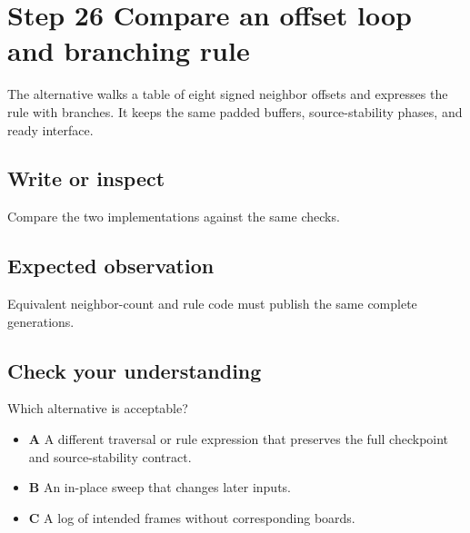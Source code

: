 \section{Step 26 Compare an offset loop and branching
  rule}\label{008-life-generations-s26-step-26-compare-an-offset-loop-and-branching-rule}

The alternative walks a table of eight signed neighbor offsets and
expresses the rule with branches. It keeps the same padded buffers,
source-stability phases, and ready interface.

\subsection{Write or
  inspect}\label{008-life-generations-s26-write-or-inspect}

Compare the two implementations against the same checks.

\subsection{Expected
  observation}\label{008-life-generations-s26-expected-observation}

Equivalent neighbor-count and rule code must publish the same complete
generations.

\subsection{Check your
  understanding}\label{008-life-generations-s26-check-your-understanding}

Which alternative is acceptable?

\begin{itemize}
  \tightlist
  \item
        \textbf{A} A different traversal or rule expression that preserves the
        full checkpoint and source-stability contract.
  \item
        \textbf{B} An in-place sweep that changes later inputs.
  \item
        \textbf{C} A log of intended frames without corresponding boards.
\end{itemize}
